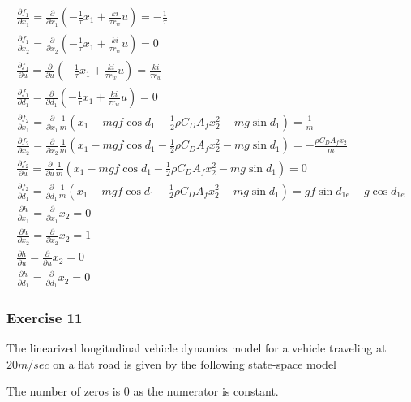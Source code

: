 \begin{eqnarray}
\frac{\partial f_1}{\partial x_1}=\frac{\partial }{\partial x_1}(-\frac{1}{\tau}x_1+\frac{ki}{\tau r_w}u)=-\frac{1}{\tau} \nonumber \\
\frac{\partial f_1}{\partial x_2}=\frac{\partial }{\partial x_2}(-\frac{1}{\tau}x_1+\frac{ki}{\tau r_w}u)=0  \nonumber \\
\frac{\partial f_1}{\partial u}=\frac{\partial }{\partial u}(-\frac{1}{\tau}x_1+\frac{ki}{\tau r_w}u)=\frac{ki}{\tau r_w}  \nonumber \\
\frac{\partial f_1}{\partial d_1}=\frac{\partial }{\partial d_1}(-\frac{1}{\tau}x_1+\frac{ki}{\tau r_w}u)=0  \nonumber \\
\frac{\partial f_2}{\partial x_1}=\frac{\partial }{\partial x_1}\frac{1}{m}\left ( x_1-mgf\cos{d_1}-\frac{1}{2}\rho C_D A_f x^2_2-mg\sin{d_1}\right )=\frac{1}{m}  \nonumber \\
\frac{\partial f_2}{\partial x_2}=\frac{\partial }{\partial x_2}\frac{1}{m}\left ( x_1-mgf\cos{d_1}-\frac{1}{2}\rho C_D A_f x^2_2-mg\sin{d_1}\right )=-\frac{\rho C_D A_f x_2}{m}  \nonumber \\
\frac{\partial f_2}{\partial u}=\frac{\partial }{\partial u}\frac{1}{m}\left ( x_1-mgf\cos{d_1}-\frac{1}{2}\rho C_D A_f x^2_2-mg\sin{d_1}\right )=0 \nonumber \\
\frac{\partial f_2}{\partial d_1}=\frac{\partial }{\partial d_1}\frac{1}{m}\left ( x_1-mgf\cos{d_1}-\frac{1}{2}\rho C_D A_f x^2_2-mg\sin{d_1}\right ) =gf\sin{d_{1e}}-g\cos{d_{1e}} \nonumber \\
\frac{\partial h}{\partial x_1}=\frac{\partial }{\partial x_1}x_2=0 \nonumber \\
\frac{\partial h}{\partial x_2}=\frac{\partial }{\partial x_2}x_2=1 \nonumber \\
\frac{\partial h}{\partial u}=\frac{\partial }{\partial u}x_2=0  \nonumber \\
\frac{\partial h}{\partial d_1}=\frac{\partial }{\partial d_1}x_2=0 \nonumber 
\end{eqnarray}

\subsubsection{Exercise 11}

The linearized longitudinal vehicle dynamics model for a vehicle traveling at $20 m/sec$ on a flat road is given by the following state-space model

The number of zeros is 0 as the numerator is constant.

